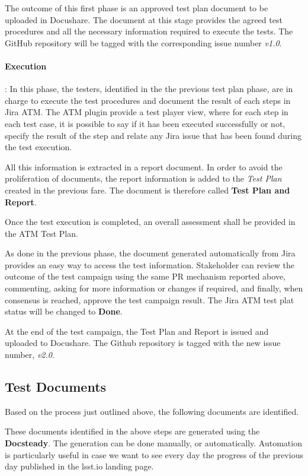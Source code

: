 The outcome of this first phase is an approved test plan document to be uploaded in Docushare. 
The document at this stage provides the agreed test procedures and all the necessary information required to execute the tests.
The GitHub repository will be tagged with the corresponding issue number \textit{v1.0}.

\paragraph{Execution}:
In this phase, the testers, identified in the the previous test plan phase, are in charge to execute the test procedures and 
document the result of each steps in Jira ATM.
The ATM plugin provide a test player view, where for each step in each test case, it is possible to say if it has been executed successfully or not,
specify the result of the step and relate any Jira issue that has been found during the test execution.

All this information is extracted in a report document.
In order to avoid the proliferation of documents, the  report information is added to the \textit{Test Plan} created in the previous fare.
The document is therefore called \textbf{Test Plan and Report}.

Once the test execution is completed, an overall assessment shall be provided in the ATM Test Plan.

As done in the previous phase, the document generated automatically from Jira provides an easy way to access the test information.
Stakeholder can review the outcome of the test campaign using the same PR mechanism reported above, 
commenting, asking for more information or changes if required, and finally, when consensus is reached, approve the test campaign result.
The Jira ATM test plat status will be changed to \textbf{Done}.

At the end of the test campaign, the Test Plan and Report is issued and uploaded to Docushare.
The Github repository is tagged with the new issue number, \textit{v2.0}.


\subsection{Test Documents}

Based on the process just outlined above, the following documents are identified.

These documents identified in the above steps are generated using the \textbf{Docsteady}.
The generation can be done manually, or automatically.
Automation is particularly useful in case we want to see every day the progress of the previous day published in the lsst.io landing page.

